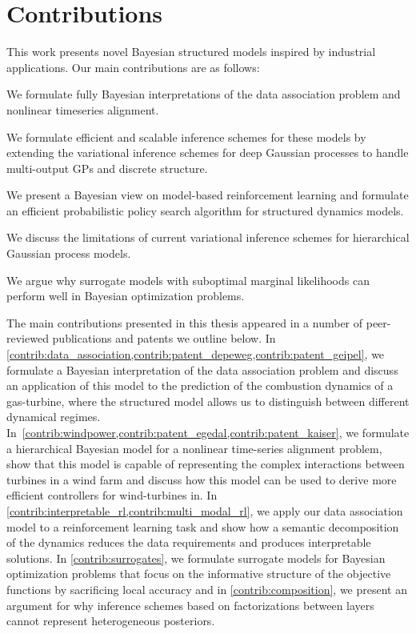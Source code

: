 \section{Contributions}
This work presents novel Bayesian structured models inspired by industrial applications.
Our main contributions are as follows:
\begin{compactitem}
    \item We formulate fully Bayesian interpretations of the data association problem and nonlinear timeseries alignment.
    \item We formulate efficient and scalable inference schemes for these models by extending the variational inference schemes for deep Gaussian processes to handle multi-output GPs and discrete structure.
    \item We present a Bayesian view on model-based reinforcement learning and formulate an efficient probabilistic policy search algorithm for structured dynamics models.
    \item We discuss the limitations of current variational inference schemes for hierarchical Gaussian process models.
    \item We argue why surrogate models with suboptimal marginal likelihoods can perform well in Bayesian optimization problems.
\end{compactitem}

The main contributions presented in this thesis appeared in a number of peer-reviewed publications and patents we outline below.
In \cref{contrib:data_association,contrib:patent_depeweg,contrib:patent_geipel}, we formulate a Bayesian interpretation of the data association problem and discuss an application of this model to the prediction of the combustion dynamics of a gas-turbine, where the structured model allows us to distinguish between different dynamical regimes.
In~\cref{contrib:windpower,contrib:patent_egedal,contrib:patent_kaiser}, we formulate a hierarchical Bayesian model for a nonlinear time-series alignment problem, show that this model is capable of representing the complex interactions between turbines in a wind farm and discuss how this model can be used to derive more efficient controllers for wind-turbines in.
In \cref{contrib:interpretable_rl,contrib:multi_modal_rl}, we apply our data association model to a reinforcement learning task and show how a semantic decomposition of the dynamics reduces the data requirements and produces interpretable solutions.
In \cref{contrib:surrogates}, we formulate surrogate models for Bayesian optimization problems that focus on the informative structure of the objective functions by sacrificing local accuracy and in \cref{contrib:composition}, we present an argument for why inference schemes based on factorizations between layers cannot represent heterogeneous posteriors.


